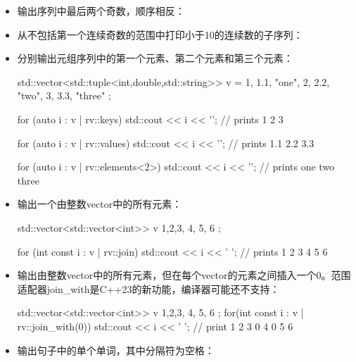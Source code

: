 \begin{itemize}
  \item 输出序列中最后两个奇数，顺序相反：

  \item 从不包括第一个连续奇数的范围中打印小于10的连续数的子序列：

  \item 分别输出元组序列中的第一个元素、第二个元素和第三个元素：

        \begin{cppcode}
std::vector<std::tuple<int,double,std::string>> v =
{
	{1, 1.1, "one"},
	{2, 2.2, "two"},
	{3, 3.3, "three"}
};

for (auto i : v | rv::keys)
	std::cout << i << '\n'; // prints 1 2 3
	
for (auto i : v | rv::values)
	std::cout << i << '\n'; // prints 1.1 2.2 3.3
	
for (auto i : v | rv::elements<2>)
	std::cout << i << '\n'; // prints one two three
\end{cppcode}
  \item 输出一个由整数vector中的所有元素：

        \begin{cppcode}
std::vector<std::vector<int>> v {
	{1,2,3}, {4}, {5, 6}
};

for (int const i : v | rv::join)
	std::cout << i << ' '; // prints 1 2 3 4 5 6
\end{cppcode}
  \item 输出由整数vector中的所有元素，但在每个vector的元素之间插入一个0。范围适配器join_with是C++23的新功能，编译器可能还不支持：

        \begin{cppcode}
std::vector<std::vector<int>> v{
	{1,2,3}, {4}, {5, 6}
};
for(int const i : v | rv::join_with(0))
	std::cout << i << ' '; // print 1 2 3 0 4 0 5 6
\end{cppcode}
  \item 输出句子中的单个单词，其中分隔符为空格：


\end{itemize}
